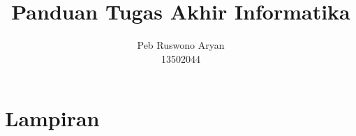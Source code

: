 \documentclass[12pt, a4paper, onecolumn, oneside, final]{report}
\begin{document}
\title{Panduan Tugas Akhir Informatika}
\date{}
\author{Peb Ruswono Aryan\\
13502044}

\setcounter{page}{0}



\pagestyle{plain}





\tableofcontents
\listoffigures
\listoftables

\setcounter{page}{0}














\appendix
{}
\part*{Lampiran}



\end{document}
